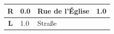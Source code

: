 \documentclass[11pt]{article}
\begin{document}
\renewcommand{\arraystretch}{1.15}
\twocolumn
{}
\tabletail{\hline}
\tablelasttail{\hline}
\begin{center}
  \begin{supertabular}{|c|p{0.30in}|p{2.25in}|l|}
  \hline
 \textbf{R} &   0.0 & Rue de l'Église &   1.0 \\ \hline
 \textbf{L} &   1.0 & Straße &  \\ \hline

\end{supertabular}
\end{center}
\end{document}
